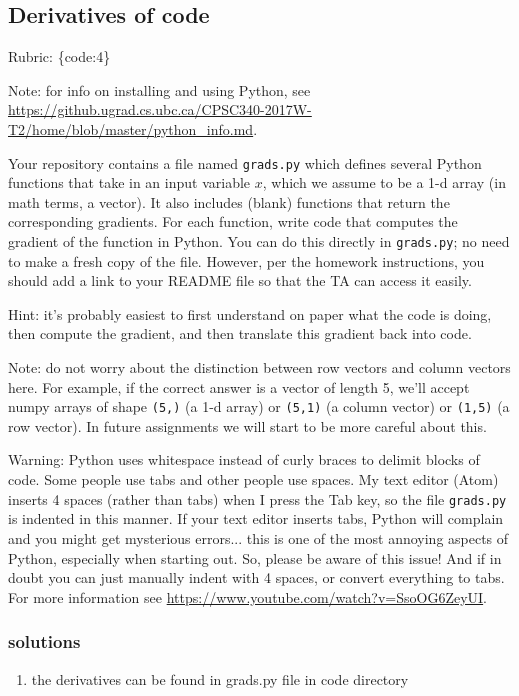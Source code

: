\documentclass{article}
\def\rubric#1{\gre{Rubric: \{#1\}}}{}
\def\blu#1{{\color{blu}#1}}
\def\gre#1{{\color{gre}#1}}
\def\enum#1{\begin{enumerate}#1\end{enumerate}}
\begin{document}
\subsection{Derivatives of code}

\rubric{code:4}

Note: for info on installing and using Python, see \url{https://github.ugrad.cs.ubc.ca/CPSC340-2017W-T2/home/blob/master/python_info.md}.

Your repository contains a file named \texttt{grads.py} which defines several Python functions that take in an input variable $x$, which we assume to be a 1-d array (in math terms, a vector).
It also includes (blank) functions that return the corresponding gradients.
For each function, \blu{write code that computes the gradient of the function} in Python. 
You can do this directly in \texttt{grads.py}; no need to make a fresh copy of the file. However, per the homework instructions, you should add a link to your README file so that the TA can access it easily. 

Hint: it's probably easiest to first understand on paper what the code is doing, then compute
the gradient, and then translate this gradient back into code.

Note: do not worry about the distinction between row vectors and column vectors here.
For example, if the correct answer is a vector of length 5, we'll accept numpy arrays
of shape \texttt{(5,)} (a 1-d array) or \texttt{(5,1)} (a column vector) or
\texttt{(1,5)} (a row vector). In future assignments we will start to be more careful
about this.

Warning: Python uses whitespace instead of curly braces to delimit blocks of code.
Some people use tabs and other people use spaces. My text editor (Atom) inserts 4 spaces (rather than tabs) when
I press the Tab key, so the file \texttt{grads.py} is indented in this manner. If your text editor inserts tabs,
Python will complain and you might get mysterious errors... this is one of the most annoying aspects
of Python, especially when starting out. So, please be aware of this issue! And if in doubt you can just manually
indent with 4 spaces, or convert everything to tabs. For more information
see \url{https://www.youtube.com/watch?v=SsoOG6ZeyUI}.

\subsubsection{solutions}
\enum{
\item the derivatives can be found in grads.py file in code directory
}
\end{document}

